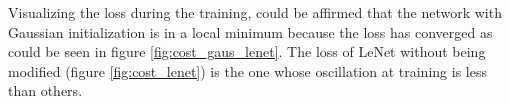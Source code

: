 Visualizing the loss during the training, could be affirmed that the network with Gaussian initialization is in a local minimum because the loss has converged as could be seen in figure \ref{fig:cost_gaus_lenet}. The loss of LeNet without being modified (figure  \ref{fig:cost_lenet}) is the one whose oscillation at training is less than others.\\

\begin{figure}[htb]    \centering

\end{figure}
